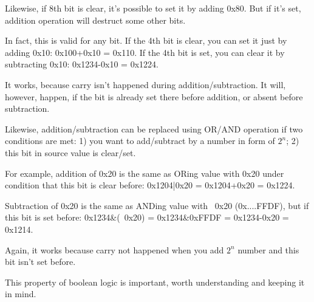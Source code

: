 Likewise, if 8th bit is clear, it's possible to set it by adding 0x80.
But if it's set, addition operation will destruct some other bits.

In fact, this is valid for any bit.
If the 4th bit is clear, you can set it just by adding 0x10: 0x100+0x10 = 0x110.
If the 4th bit is set, you can clear it by subtracting 0x10: 0x1234-0x10 = 0x1224.

It works, because carry isn't happened during addition/subtraction.
It will, however, happen, if the bit is already set there before addition, or absent before subtraction.

Likewise, addition/subtraction can be replaced using OR/AND operation if two conditions are met:
1) you want to add/subtract by a number in form of $2^n$;
2) this bit in source value is clear/set.

For example, addition of 0x20 is the same as ORing value with 0x20 under condition that this bit is clear before:
0x1204|0x20 = 0x1204+0x20 = 0x1224.

Subtraction of 0x20 is the same as ANDing value with ~0x20 (0x....FFDF), but if this bit is set before:
0x1234\&(~0x20) = 0x1234\&0xFFDF = 0x1234-0x20 = 0x1214.

Again, it works because carry not happened when you add $2^n$ number and this bit isn't set before.

This property of boolean logic is important, worth understanding and keeping it in mind.

